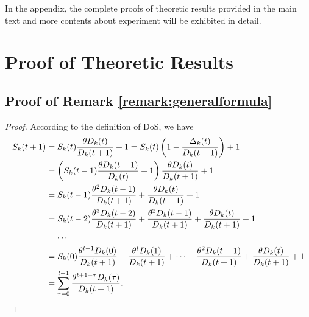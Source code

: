 \documentclass{article}
\theoremstyle{plain}
\theoremstyle{definition}
\theoremstyle{remark}
\begin{document}



\nocite{langley00}





\newpage
\appendix
\onecolumn
In the appendix, the complete proofs of theoretic results provided in the main text and more contents about experiment will be exhibited in detail.
\section{Proof of Theoretic Results}
\subsection{Proof of Remark \ref{remark:generalformula}}
\label{proof:generalformula}
\begin{proof}
    According to the definition of DoS, we have
    \begin{align}
      S_k(t+1) & = S_k(t) \frac{\theta D_k(t)}{D_k(t+1)} + 1 = S_k(t)\left(1 - \frac{\Delta_k(t)}{D_k(t+1)}\right) + 1 \notag \\
               & = \left(S_k(t-1) \frac{\theta D_k(t-1)}{D_k(t)} + 1\right) \frac{\theta D_k(t)}{D_k(t+1)} + 1 \notag \\
               & = S_k(t-1) \frac{\theta^2 D_k(t-1)}{D_k(t+1)} + \frac{\theta D_k(t)}{D_k(t+1)} + 1 \notag \\
               & = S_k(t-2) \frac{\theta^3 D_k(t-2)}{D_k(t+1)} + \frac{\theta^2 D_k(t-1)}{D_k(t+1)} + \frac{\theta D_k(t)}{D_k(t+1)} + 1 \notag \\
               & = \cdots \notag \\
               & = S_k(0) \frac{\theta^{t+1} D_k(0)}{D_k(t+1)} + \frac{\theta^t D_k(1)}{D_k(t+1)} + \cdots + \frac{\theta^2 D_k(t-1)}{D_k(t+1)} + \frac{\theta D_k(t)}{D_k(t+1)} + 1 \notag \\
               & = \sum_{\tau = 0}^{t+1} \frac{\theta^{t+1-\tau} D_k(\tau)}{D_k(t+1)}.
    \end{align}
  \end{proof}
\end{document}
